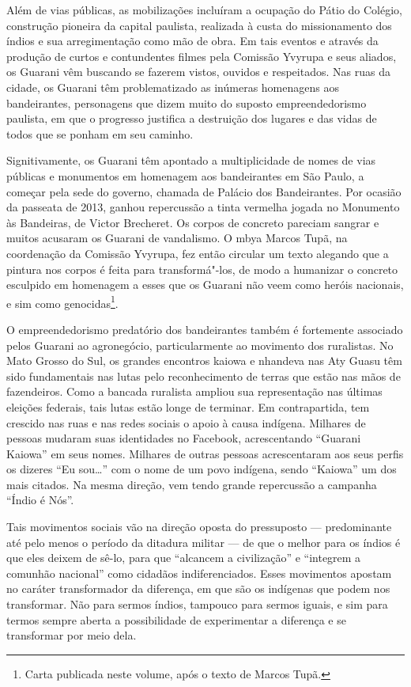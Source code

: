 Além de vias públicas, as mobilizações incluíram a ocupação do Pátio do
Colégio, construção pioneira da capital paulista, realizada à custa do
missionamento dos índios e sua arregimentação como mão de obra. Em tais
eventos e através da produção de curtos e contundentes filmes pela
Comissão Yvyrupa e seus aliados, os Guarani vêm buscando se fazerem
vistos, ouvidos e respeitados. Nas ruas da cidade, os Guarani têm
problematizado as inúmeras homenagens aos bandeirantes, personagens que
dizem muito do suposto empreendedorismo paulista, em que o progresso
justifica a destruição dos lugares e das vidas de todos que se ponham
em seu caminho.

Signitivamente, os Guarani têm apontado a multiplicidade de nomes de
vias públicas e monumentos em homenagem aos bandeirantes em São Paulo,
a começar pela sede do governo, chamada de Palácio dos Bandeirantes.
Por ocasião da passeata de 2013, ganhou repercussão a tinta vermelha
jogada no Monumento às Bandeiras, de Victor Brecheret. Os corpos de
concreto pareciam sangrar e muitos acusaram os Guarani de vandalismo. O
mbya Marcos Tupã, na coordenação da Comissão Yvyrupa, fez então
circular um texto alegando que a pintura nos corpos é feita para
transformá"-los, de modo a humanizar o concreto esculpido em homenagem a
esses que os Guarani não veem como heróis nacionais, e sim como
genocidas\footnote{Carta publicada neste volume, após o texto de
Marcos Tupã.}.

O empreendedorismo predatório dos bandeirantes também é fortemente
associado pelos Guarani ao agronegócio, particularmente ao movimento
dos ruralistas. No Mato Grosso do Sul, os grandes encontros kaiowa e
nhandeva nas Aty Guasu têm sido fundamentais nas lutas pelo
reconhecimento de terras que estão nas mãos de fazendeiros. Como a
bancada ruralista ampliou sua representação nas últimas eleições
federais, tais lutas estão longe de terminar. Em contrapartida, tem
crescido nas ruas e nas redes sociais o apoio à causa indígena.
Milhares de pessoas mudaram suas identidades no Facebook, acrescentando
``Guarani Kaiowa'' em seus nomes. Milhares de outras pessoas
acrescentaram aos seus perfis os dizeres ``Eu sou\ldots{}'' com o nome de um
povo indígena, sendo ``Kaiowa'' um dos mais citados. Na mesma direção,
vem tendo grande repercussão a campanha ``Índio é Nós''.

Tais movimentos sociais vão na direção oposta do pressuposto ---
predominante até pelo menos o período da ditadura militar --- de que o
melhor para os índios é que eles deixem de sê-lo, para que ``alcancem a
civilização'' e ``integrem a comunhão nacional'' como cidadãos
indiferenciados. Esses movimentos apostam no caráter transformador da
diferença, em que são os indígenas que podem nos transformar. Não para
sermos índios, tampouco para sermos iguais, e sim para termos sempre
aberta a possibilidade de experimentar a diferença e se transformar por
meio dela.

